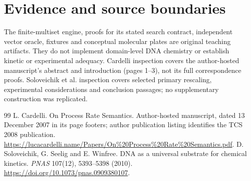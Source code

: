 \chapter*{Evidence and source boundaries}
The finite-multiset engine, proofs for its stated search contract, independent
vector oracle, fixtures and conceptual molecular plates are original teaching
artifacts. They do not implement domain-level DNA chemistry or establish kinetic
or experimental adequacy. Cardelli inspection covers the author-hosted manuscript's
abstract and introduction (pages 1--3), not its full correspondence proofs.
Soloveichik et al. inspection covers selected primary rescaling, experimental
considerations and conclusion passages; no supplementary construction was replicated.
\begin{thebibliography}{99}
 L. Cardelli. On Process Rate Semantics.
Author-hosted manuscript, dated 13 December 2007 in its page footers;
author publication listing identifies the TCS 2008 publication.
\url{https://lucacardelli.name/Papers/On\%20Process\%20Rate\%20Semantics.pdf}.
 D. Soloveichik, G. Seelig and E. Winfree.
DNA as a universal substrate for chemical kinetics.
\emph{PNAS} 107(12), 5393--5398 (2010).
\url{https://doi.org/10.1073/pnas.0909380107}.
\end{thebibliography}
